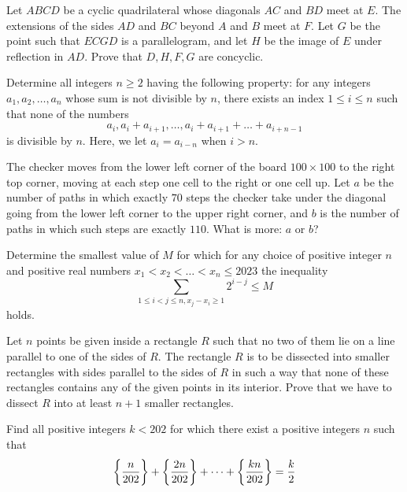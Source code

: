 \documentclass[11pt]{scrartcl}
\begin{document}
\begin{problem}[674938537981329]
Let $ABCD$ be a cyclic quadrilateral whose diagonals $AC$ and $BD$ meet at $E$. The extensions of the sides $AD$ and $BC$ beyond $A$ and $B$ meet at $F$. Let $G$ be the point such that $ECGD$ is a parallelogram, and let $H$ be the image of $E$ under reflection in $AD$. Prove that $D,H,F,G$ are concyclic.
\end{problem}
\begin{problem}[676918769934959]
Determine all integers $ n\geq 2$ having the following property: for any integers $a_1,a_2,\ldots, a_n$ whose sum is not divisible by $n$, there exists an index $1 \leq i \leq n$ such that none of the numbers$$a_i,a_i+a_{i+1},\ldots,a_i+a_{i+1}+\ldots+a_{i+n-1}$$is divisible by $n$. Here, we let $a_i=a_{i-n}$ when $i >n$.
\end{problem}
\begin{problem}[677860185151955]
	The checker moves from the lower left corner of the board $100 \times 100$ to the right top corner, moving at each step one cell to the right or one cell up. Let $a$ be the number of paths in which exactly $70$ steps the checker take under the diagonal going from the lower left corner to the upper right corner, and $b$ is the number of paths in which such steps are exactly $110$. What is more: $a$ or $b$?
\end{problem}
\begin{problem}[678030172296176]
Determine the smallest value of $M$ for which for any choice of positive integer $n$ and positive real numbers $x_1<x_2<\ldots<x_n \le 2023$ the inequality
$$\sum_{1\le i < j \le n , x_j-x_i \ge 1} 2^{i-j}\le M$$holds.
\end{problem}
\begin{problem}[680055064158556]
Let $n$ points be given inside a rectangle $R$ such that no two of them lie on a line parallel to one of the sides of $R$. The rectangle $R$ is to be dissected into smaller rectangles with sides parallel to the sides of $R$ in such a way that none of these rectangles contains any of the given points in its interior. Prove that we have to dissect $R$ into at least $n + 1$ smaller rectangles.
\end{problem}
\begin{problem}[680158311639624]
Find all positive integers $k<202$ for which there exist a positive integers $n$ such that
$$\bigg {\{}\frac{n}{202}\bigg {\}}+\bigg {\{}\frac{2n}{202}\bigg {\}}+\cdots +\bigg {\{}\frac{kn}{202}\bigg {\}}=\frac{k}{2}$$
\end{problem}
\end{document}
